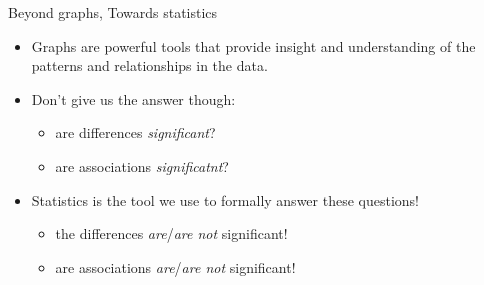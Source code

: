 \documentclass[ignorenonframetext,t]{beamer}
\providecommand{\tightlist}{%
  \setlength{\itemsep}{0pt}\setlength{\parskip}{0pt}}
\begin{document}
\begin{frame}{Beyond graphs, Towards statistics}

\begin{itemize}
\item
  Graphs are powerful tools that provide insight and understanding of
  the patterns and relationships in the data.
\item
  Don't give us the answer though:

  \begin{itemize}
  \tightlist
  \item
    are differences \emph{significant}?
  \item
    are associations \emph{significatnt}?
  \end{itemize}
\item
  Statistics is the tool we use to formally answer these questions!

  \begin{itemize}
  \tightlist
  \item
    the differences \emph{are}/\emph{are not} significant!
  \item
    are associations \emph{are}/\emph{are not} significant!
  \end{itemize}
\end{itemize}

\end{frame}
\end{document}
